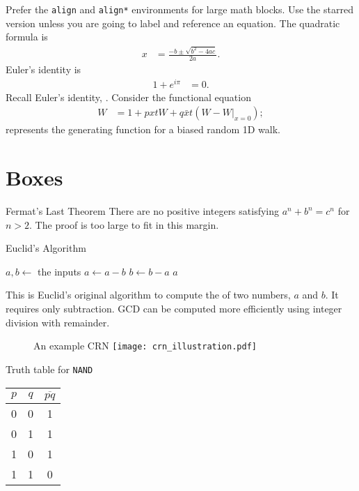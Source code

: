 Prefer the \verb|align| and \verb|align*| environments for large math blocks.
Use the starred version unless you are going to label and reference an equation.
The quadratic formula is
\begin{align*}
    x &= \frac{-b \pm \sqrt{b^2-4ac}}{2a}.
\end{align*}
Euler's identity is
\begin{align}
    1 + e^{i\pi} &= 0.
    \label{eqn:tut:euler}
\end{align}
Recall Euler's identity, .
Consider the functional equation
\begin{align}
    \tag{\ast}
    W &= 1 + pxtW + q\bar x t(W - W|_{x=0});
    \label{eqn:tut:func}
\end{align}
 represents the generating function for a biased random 1D walk.

\section{Boxes}

\begin{theorem}{Fermat's Last Theorem}
  There are no positive integers satisfying $a^n + b^n = c^n$ for $n>2$.
\proof
  The proof is too large to fit in this margin.
\end{theorem}

\begin{breakout}[label=box:tut:gcd]{Euclid's Algorithm}
  \begin{algorithmic}
    \State $a,b \gets$ the inputs
        \State $a \gets a - b$ 
      \Else
        \State $b \gets b - a$
      \EndIf
    \EndWhile
    \State \Return $a$
  \end{algorithmic}
\tcblower
  This is Euclid's original algorithm to compute the  of two numbers, $a$ and $b$.
  It requires only subtraction.
  GCD can be computed more efficiently using integer division with remainder.
\end{breakout}

\begin{figure}[label=fig:tut:myfigure,credit={Credit: Anastasia Ershova}]{An example CRN}
  \texttt{[image: crn\_illustration.pdf]}
\end{figure}

\begin{table}[label=tbl:tut:mytable]{Truth table for \texttt{NAND}}
  \begin{tabular}{cc|c}
    $p$ & $q$ & $\overline{pq}$ \\ \hline
    0 & 0 & 1 \\
    0 & 1 & 1 \\
    1 & 0 & 1 \\
    1 & 1 & 0 \\
  \end{tabular}
\end{table}

